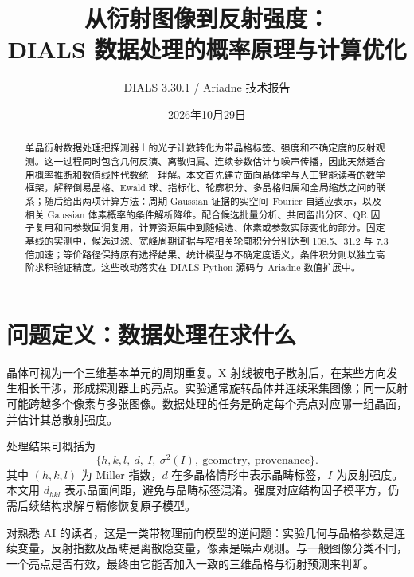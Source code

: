 \documentclass[UTF8,11pt,a4paper,fontset=fandol]{ctexart}
\title{从衍射图像到反射强度：\\DIALS 数据处理的概率原理与计算优化}
\author{DIALS 3.30.1 / Ariadne 技术报告}
\date{2026年10月29日}
\begin{document}
\maketitle
\begin{abstract}
单晶衍射数据处理把探测器上的光子计数转化为带晶格标签、强度和不确定度的反射观测。这一过程同时包含几何反演、离散归属、连续参数估计与噪声传播，因此天然适合用概率推断和数值线性代数统一理解。本文首先建立面向晶体学与人工智能读者的数学框架，解释倒易晶格、Ewald 球、指标化、轮廓积分、多晶格归属和全局缩放之间的联系；随后给出两项计算方法：周期 Gaussian 证据的实空间--Fourier 自适应表示，以及相关 Gaussian 体素概率的条件解析降维。配合候选批量分析、共同留出分区、QR 因子复用和同参数回调复用，计算资源集中到随候选、体素或参数实际变化的部分。固定基线的实测中，候选过滤、宽峰周期证据与窄相关轮廓积分分别达到 108.5、31.2 与 7.3 倍加速；等价路径保持原有选择结果、统计模型与不确定度语义，条件积分则以独立高阶求积验证精度。这些改动落实在 DIALS Python 源码与 Ariadne 数值扩展中。
\end{abstract}
\tableofcontents
\newpage

\section{问题定义：数据处理在求什么}
晶体可视为一个三维基本单元的周期重复。X 射线被电子散射后，在某些方向发生相长干涉，形成探测器上的亮点。实验通常旋转晶体并连续采集图像；同一反射可能跨越多个像素与多张图像。数据处理的任务是确定每个亮点对应哪一组晶面，并估计其总散射强度。

处理结果可概括为
\begin{equation}
\bigl\{h,k,l,\ d,\ I,\ \sigma^2(I),\ \text{geometry},\ \text{provenance}\bigr\}.
\end{equation}
其中 $(h,k,l)$ 为 Miller 指数，$d$ 在多晶格情形中表示晶畴标签，$I$ 为反射强度。本文用 $d_{hkl}$ 表示晶面间距，避免与晶畴标签混淆。强度对应结构因子模平方，仍需后续结构求解与精修恢复原子模型。

对熟悉 AI 的读者，这是一类带物理前向模型的逆问题：实验几何与晶格参数是连续变量，反射指数及晶畴是离散隐变量，像素是噪声观测。与一般图像分类不同，一个亮点是否有效，最终由它能否加入一致的三维晶格与衍射预测来判断。
\end{document}

